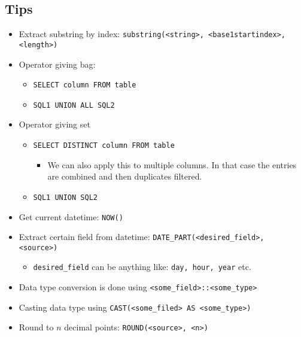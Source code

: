 \subsection{Tips}
\begin{itemize}
    \item Extract substring by index: \verb+substring(<string>, <base1startindex>, <length>)+
    \item Operator giving bag:
        \begin{itemize}
            \item \verb+SELECT column FROM table+
            \item \verb+SQL1 UNION ALL SQL2+
        \end{itemize}
    \item Operator giving set
        \begin{itemize}
            \item \verb+SELECT DISTINCT column FROM table+
                \begin{itemize}
                    \item We can also apply this to multiple columns. In that case the entries are combined and then duplicates filtered.
                \end{itemize}
            \item \verb+SQL1 UNION SQL2+
        \end{itemize}
    \item Get current datetime: \verb+NOW()+
    \item Extract certain field from datetime: \verb+DATE_PART(<desired_field>, <source>)+
        \begin{itemize}
            \item \verb+desired_field+ can be anything like: \verb+day, hour, year+ etc.
        \end{itemize}
    \item Data type conversion is done using \verb+<some_field>::<some_type>+
    \item Casting data type using \verb+CAST(<some_filed> AS <some_type>)+
    \item Round to $n$ decimal points: \verb+ROUND(<source>, <n>)+
\end{itemize}
